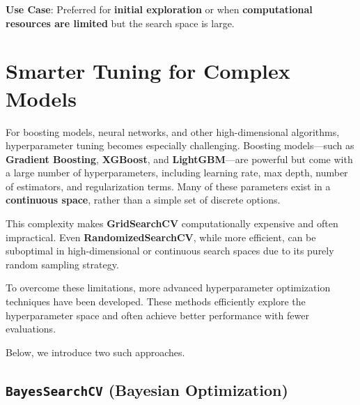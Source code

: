\documentclass[
  letterpaper,
  DIV=11,
  numbers=noendperiod]{scrreprt}
\begin{document}
\textbf{Use Case}: Preferred for \textbf{initial exploration} or when
\textbf{computational resources are limited} but the search space is
large.

\section{Smarter Tuning for Complex
Models}\label{smarter-tuning-for-complex-models}

For boosting models, neural networks, and other high-dimensional
algorithms, hyperparameter tuning becomes especially challenging.
Boosting models---such as \textbf{Gradient Boosting}, \textbf{XGBoost},
and \textbf{LightGBM}---are powerful but come with a large number of
hyperparameters, including learning rate, max depth, number of
estimators, and regularization terms. Many of these parameters exist in
a \textbf{continuous space}, rather than a simple set of discrete
options.

This complexity makes \textbf{GridSearchCV} computationally expensive
and often impractical. Even \textbf{RandomizedSearchCV}, while more
efficient, can be suboptimal in high-dimensional or continuous search
spaces due to its purely random sampling strategy.

To overcome these limitations, more advanced hyperparameter optimization
techniques have been developed. These methods efficiently explore the
hyperparameter space and often achieve better performance with fewer
evaluations.

Below, we introduce two such approaches.

\subsection{\texorpdfstring{\texttt{BayesSearchCV} (Bayesian
Optimization)}{BayesSearchCV (Bayesian Optimization)}}\label{bayessearchcv-bayesian-optimization}
\end{document}
